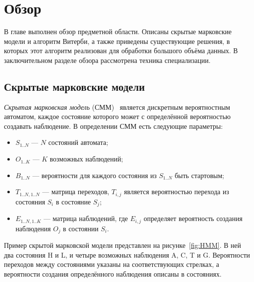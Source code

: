 \section{Обзор}
В главе выполнен обзор предметной области.
Описаны скрытые марковские модели и алгоритм Витерби,
а также приведены существующие решения, в которых этот 
алгоритм реализован для обработки большого объёма данных.
В заключительном разделе обзора рассмотрена техника специализации.

\subsection{Скрытые марковские модели}
\label{lab:HMM}
\emph{Скрытая марковская модель} (СММ)~\cite{Eddy_HMM}
является дискретным вероятностным автоматом, каждое состояние которого может с определённой вероятностью создавать наблюдение.
В определении СММ есть следующие параметры:
\begin{itemize}
	\item $\mathit{S_{1..N}}$ --- $N$ состояний автомата;
	\item $\mathit{O_{1..K}}$ --- $K$ возможных наблюдений;
	\item $\mathit{B_{1..N}}$ --- вероятности для каждого состояния из $\mathit{S_{1..N}}$ быть стартовым;
	\item $\mathit{T_{1..N, 1..N}}$ --- матрица переходов, $\mathit{T_{i,j}}$ является вероятностью перехода из состояния
$\mathit{S_{i}}$ в состояние $\mathit{S_{j}}$;
	\item $\mathit{E_{1..N, 1..K}}$ --- матрица наблюдений, 
где $\mathit{E_{i,j}}$ определяет вероятность создания наблюдения $\mathit{O_{j}}$ в состоянии $\mathit{S_{i}}$.
\end{itemize}
Пример скрытой марковской модели представлен на рисунке~\ref{fig:HMM}.
В ней два состояния H и L, и четыре возможных наблюдения A, C, T и G.
Вероятности переходов между состояниями указаны на соответствующих стрелках, а вероятности создания определённого наблюдения описаны в состояниях.

